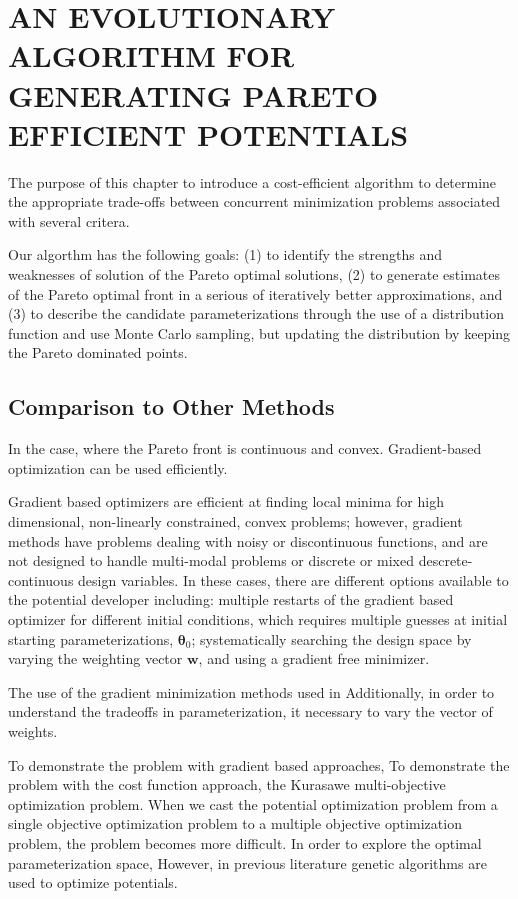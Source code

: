 \chapter{AN EVOLUTIONARY ALGORITHM FOR GENERATING PARETO EFFICIENT POTENTIALS}

The purpose of this chapter to introduce a cost-efficient algorithm to determine the appropriate trade-offs between concurrent minimization problems associated with several critera.

Our algorthm has the following goals: (1) to identify the strengths and weaknesses of solution of the Pareto optimal solutions, (2) to generate estimates of the Pareto optimal front in a serious of iteratively better approximations, and (3) to describe the candidate parameterizations through the use of a distribution function and use Monte Carlo sampling, but updating the distribution by keeping the Pareto dominated points.


\section{Comparison to Other Methods}

In the case, where the Pareto front is continuous and convex.  Gradient-based optimization can be used efficiently.

Gradient based optimizers are efficient at finding local minima for high dimensional, non-linearly constrained, convex problems; however, gradient methods have problems dealing with noisy or discontinuous functions, and are not designed to handle multi-modal problems or discrete or mixed descrete-continuous design variables.  In these cases, there are different options available to the potential developer including: multiple restarts of the gradient based optimizer for different initial conditions, which requires multiple guesses at initial starting parameterizations, $\bm{\theta}_0$; systematically searching the design space by varying the weighting vector $\bm{w}$, and using a gradient free minimizer.

The use of the gradient minimization methods used in
Additionally, in order to understand the tradeoffs in parameterization, it necessary to vary the vector of weights.

To demonstrate the problem with gradient based approaches,
To demonstrate the problem with the cost function approach, the Kurasawe multi-objective optimization problem\cite{kurasawe1991_pareto}.
When we cast the potential optimization problem from a single objective optimization problem to a multiple objective optimization problem, the problem becomes more difficult.  In order to explore the optimal parameterization space,
However, in previous literature genetic algorithms are used to optimize potentials.

